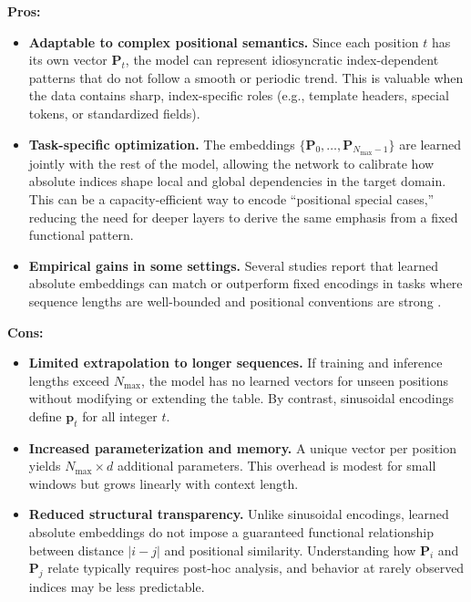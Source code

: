 \noindent
\textbf{Pros:}
\begin{itemize}
	\item \textbf{Adaptable to complex positional semantics.}
	Since each position \(t\) has its own vector \(\mathbf{P}_t\),
	the model can represent idiosyncratic index-dependent patterns that do not follow a smooth or periodic trend.
	This is valuable when the data contains sharp, index-specific roles (e.g., template headers, special tokens, or standardized fields).
	
	\item \textbf{Task-specific optimization.}
	The embeddings \(\{\mathbf{P}_0,\dots,\mathbf{P}_{N_{\max}-1}\}\) are learned jointly with the rest of the model,
	allowing the network to calibrate how absolute indices shape local and global dependencies in the target domain.
	This can be a capacity-efficient way to encode ``positional special cases,'' reducing the need for deeper layers to derive the same emphasis from a fixed functional pattern.
	
	\item \textbf{Empirical gains in some settings.}
	Several studies report that learned absolute embeddings can match or outperform fixed encodings in tasks where sequence lengths are well-bounded and positional conventions are strong \cite{ke2021rethinking_position,shaw2018selfrelative_pos}.
\end{itemize}

\noindent
\textbf{Cons:}
\begin{itemize}
	\item \textbf{Limited extrapolation to longer sequences.}
	If training and inference lengths exceed \(N_{\max}\),
	the model has no learned vectors for unseen positions without modifying or extending the table.
	By contrast, sinusoidal encodings define \(\mathbf{p}_t\) for all integer \(t\).
	
	\item \textbf{Increased parameterization and memory.}
	A unique vector per position yields \(N_{\max}\times d\) additional parameters.
	This overhead is modest for small windows but grows linearly with context length.
	
	\item \textbf{Reduced structural transparency.}
	Unlike sinusoidal encodings, learned absolute embeddings do not impose a guaranteed functional relationship between distance \(|i-j|\) and positional similarity.
	Understanding how \(\mathbf{P}_i\) and \(\mathbf{P}_j\) relate typically requires post-hoc analysis, and behavior at rarely observed indices may be less predictable.
\end{itemize}

